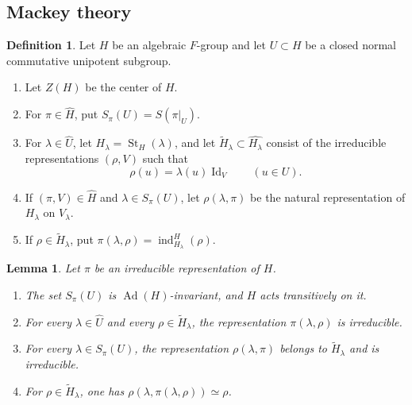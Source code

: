 \documentclass[11pt,a4paper,twoside]{amsart}
\newtheorem{lemma}[theorem]{Lemma}
\theoremstyle{definition}
\newtheorem{definition}[theorem]{Definition}
\theoremstyle{remark}
\newcommand{\bl}{\lambda}
\newcommand{\Ad}{\operatorname{Ad}}
\newcommand{\ind}{\operatorname{ind}}
\newcommand{\St}{\operatorname{St}}
\newcommand{\Id}{\operatorname{Id}}
\begin{document}
\subsection{Mackey theory}
\begin{definition}\label{Mac0}
Let $H$ be an algebraic $F$-group and let $U\subset H$ be a closed normal commutative unipotent subgroup.
\begin{enumerate}
\item Let $Z(H)$ be the center of $H$.
\item For $\pi\in\widehat H$, put $S_\pi(U)=S(\pi|_U)$.
\item For $\bl\in\widehat U$, let $H_\bl=\St_H(\bl)$, and let $\widetilde H_\bl\subset\widehat{H_\bl}$ consist of the irreducible representations $(\rho,V)$ such that
$$
\rho(u)=\bl(u)\Id_V\qquad(u\in U).
$$
\item If $(\pi,V)\in\widehat H$ and $\bl\in S_\pi(U)$, let $\rho(\bl,\pi)$ be the natural representation of $H_\bl$ on $V_\bl$.
\item If $\rho\in\widetilde H_\bl$, put $\pi(\bl,\rho)=\ind_{H_\bl}^H(\rho)$.
\end{enumerate}
\end{definition}
\begin{lemma}\label{MM}
Let $\pi$ be an irreducible representation of $H$.
\begin{enumerate}
\item The set $S_\pi(U)$ is $\Ad(H)$-invariant, and $H$ acts transitively on it.
\item For every $\bl\in\widehat U$ and every $\rho\in\widetilde H_\bl$, the representation $\pi(\bl,\rho)$ is irreducible.
\item For every $\bl\in S_\pi(U)$, the representation $\rho(\bl,\pi)$ belongs to $\widetilde H_\bl$ and is irreducible.
\item For $\rho\in\widetilde H_\bl$, one has $\rho(\bl,\pi(\bl,\rho))\simeq\rho$.
\end{enumerate}
\end{lemma}
\end{document}
